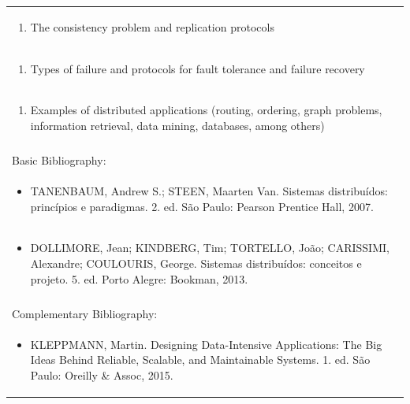 \documentclass[11pt]{article}
\begin{document}
\begin{center}
\begin{longtable}{|p{4cm}|p{4cm}|p{4cm}|p{4cm}|}
\multicolumn{4}{|p{\dimexpr 16cm + 6\tabcolsep\relax}|}{\begin{enumerate}[start=7]\item The consistency problem and replication protocols\end{enumerate}}\\
\multicolumn{4}{|p{\dimexpr 16cm + 6\tabcolsep\relax}|}{\begin{enumerate}[start=8]\item Types of failure and protocols for fault tolerance and failure recovery\end{enumerate}}\\
\multicolumn{4}{|p{\dimexpr 16cm + 6\tabcolsep\relax}|}{\begin{enumerate}[start=9]\item Examples of distributed applications (routing, ordering, graph problems, information retrieval, data mining, databases, among others)\end{enumerate}}\\
\multicolumn{4}{|p{\dimexpr 16cm + 6\tabcolsep\relax}|}{}\\
\hline
\multicolumn{4}{|p{16cm}|}{Basic Bibliography:}\\*
\multicolumn{4}{|p{\dimexpr 16cm + 6\tabcolsep\relax}|}{\begin{itemize}\item TANENBAUM, Andrew S.; STEEN, Maarten Van. Sistemas distribuídos: princípios e paradigmas. 2. ed. São Paulo: Pearson Prentice Hall, 2007.\end{itemize}}\\
\multicolumn{4}{|p{\dimexpr 16cm + 6\tabcolsep\relax}|}{\begin{itemize}\item DOLLIMORE, Jean; KINDBERG, Tim; TORTELLO, João; CARISSIMI, Alexandre; COULOURIS, George. Sistemas distribuídos: conceitos e projeto. 5. ed. Porto Alegre: Bookman, 2013.\end{itemize}}\\
\multicolumn{4}{|p{16cm}|}{}\\
\hline
\multicolumn{4}{|p{16cm}|}{Complementary Bibliography:}\\*
\multicolumn{4}{|p{\dimexpr 16cm + 6\tabcolsep\relax}|}{\begin{itemize}\item KLEPPMANN, Martin. Designing Data-Intensive Applications: The Big Ideas Behind Reliable, Scalable, and Maintainable Systems. 1. ed. São Paulo: Oreilly \& Assoc, 2015.\end{itemize}}\\

\end{longtable}
\end{center}
\end{document}
